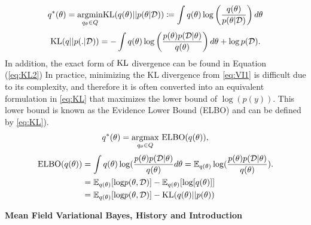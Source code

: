 \begin{equation}
	\label{eq:VI1}
	q^{*}(\theta) = \underset{q_{\theta} \in Q}{\operatorname{argmin}} \textnormal{KL}(q(\theta)||p(\theta|\mathcal{D})) \coloneqq \int q(\theta)\log\left(\frac{q(\theta)}{p(\theta|\mathcal{D})}\right)d\theta
\end{equation}
\begin{equation}
	\label{eq:KL2}
	\textnormal{KL}(q||p(.|\mathcal{D})) = - \int q(\theta)\log\left(\frac{p(\theta)p(\mathcal{D}|\theta)}{q(\theta)}\right) d\theta + \log p(\mathcal{D}).
\end{equation}
In addition, the exact form of $\textnormal{KL}$ divergence can be found in Equation (\ref{eq:KL2})
In practice, minimizing the KL divergence from \autoref{eq:VI1} is difficult due to its complexity, and therefore it is often converted into an equivalent formulation in \autoref{eq:KL} that maximizes the lower bound of $\log(p(y))$. This lower bound is known as the Evidence Lower Bound (ELBO) and can be defined by \autoref{eq:KL}).
\begin{equation}
	\label{eq:KL}
	q^*(\theta) = \underset{q_{\theta} \in Q}{\operatorname{ argmax}} \textnormal{ ELBO}(q(\theta)),
\end{equation}
\begin{equation}
	\label{eq:ELBO}	
	\begin{aligned}
		\textnormal{ELBO}(q(\theta)) &= \int q(\theta)\log(\frac{p(\theta)p(\mathcal{D}|\theta)}{q(\theta)}d\theta = \mathop{\mathbb{E}_{q(\theta)}}\log(\frac{p(\theta)p(\mathcal{D}|\theta)}{q(\theta)}).\\
		& = \mathop{\mathbb{E}_{q(\theta)}}[\textnormal{log}p(\theta,\mathcal{D})]
		- \mathop{\mathbb{E}_{q(\theta)}}[\textnormal{log}[q(\theta)]]\\
		&= \mathop{\mathbb{E}_{q(\theta)}}[\textnormal{log}p(\theta,\mathcal{D})]
		- \textnormal{KL}(q(\theta)||p(\theta))\\
	\end{aligned}
\end{equation}

\textbf{Mean Field Variational Bayes, History and Introduction}

